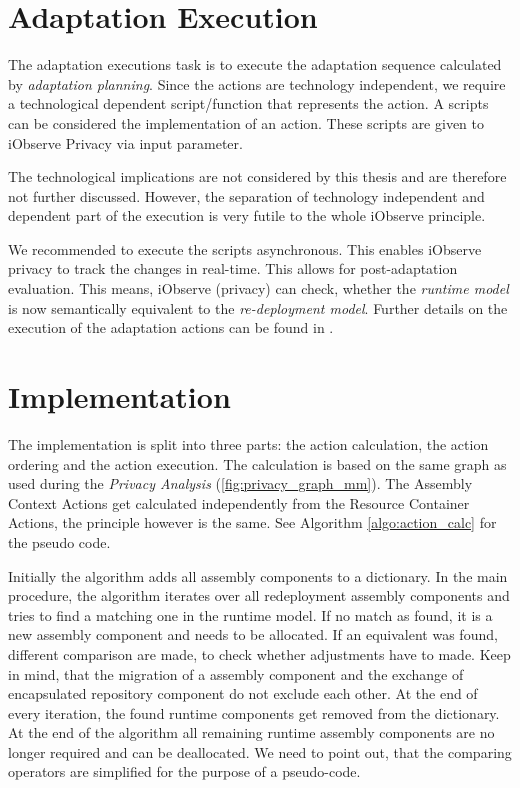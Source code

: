 \section{Adaptation Execution}
\label{sec:SysAdap:exec}

The adaptation executions task is to execute the adaptation sequence calculated by \textit{adaptation planning}. Since the actions are technology independent, we require a technological dependent script/function that represents the action. A scripts can be considered the implementation of an action. These scripts are given to iObserve Privacy via input parameter.

The technological implications are not considered by this thesis and are therefore not further discussed. However, the separation of technology independent and dependent part of the execution is very futile to the whole iObserve principle.

We recommended to execute the scripts asynchronous. This enables iObserve privacy to track the changes in real-time. This allows for post-adaptation evaluation. This means, iObserve (privacy) can check, whether the \textit{runtime model} is now semantically equivalent to the \textit{re-deployment model}. Further details on the execution of the adaptation actions can be found in \cite{TobiasPoppke.20170626}.


\section{Implementation}
\label{sec:SysAdap:impl}


The implementation is split into three parts: the action calculation, the action ordering and the action execution. The calculation is based on the same graph as used during the \textit{Privacy Analysis} (\autoref{fig:privacy_graph_mm}). The Assembly Context Actions get calculated independently from the Resource Container Actions, the principle however is the same. See Algorithm \autoref{algo:action_calc} for the pseudo code.

Initially the algorithm adds all assembly components to a dictionary. In the main procedure, the algorithm iterates over all redeployment assembly components and tries to find a matching one in the runtime model. If no match as found, it is a new assembly component and needs to be allocated. If an equivalent was found, different comparison are made, to check whether adjustments have to made. Keep in mind, that the migration of a assembly component and the exchange of encapsulated repository component do not exclude each other. At the end of every iteration, the found runtime components get removed from the dictionary. At the end of the algorithm all remaining runtime assembly components are no longer required and can be deallocated. We need to point out, that the comparing operators are simplified for the purpose of a pseudo-code.

